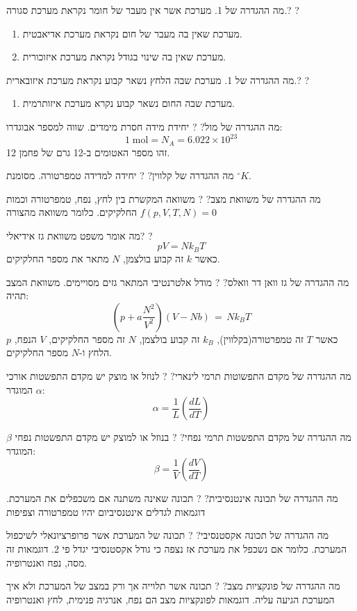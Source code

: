 \documentclass{tstextbook}
\begin{document}
מה ההגדרה של 1. מערכת אשר אין מעבר של חומר נקראת מערכת סגורה.?
?

\begin{enumerate}
  \item מערכת שאין בה מעבר של חום נקראת מערכת אדיאבטית. 


  \item מערכת שאין בה שינוי בגודל נקראת מערכת איזוכורית. 


\end{enumerate}
מה ההגדרה של 1. מערכת שבה הלחץ נשאר קבוע נקראת מערכת איזובארית.?
?

\begin{enumerate}
  \item מערכת שבה החום נשאר קבוע נקרא מערכת איזותרמית. 
\end{enumerate}
מה ההגדרה של מול?
?
יחידת מידה חסרת מימדים. שווה למספר אבוגדרו:
$$1\;{\mathrm{mol}}=N_{A}=6.022\times10^{23}$$
זהו מספר האטומים ב-12 גרם של פחמן 12.

מה ההגדרה של קלווין?
?
יחידה למדידה טמפרטורה. מסומנת \(^\circ K\).

מה ההגדרה של משוואת מצב?
?
משוואה המקשרת בין לחץ, נפח, טמפרטורה וכמות החלקיקים. כלומר משוואה מהצורה \(f\left(p,V,T,N \right)=0\)

מה אומר משפט משוואת גז אידיאלי?
?
$$pV = Nk_{B}T$$
כאשר \(k\) זה קבוע בולצמן, \(N\) מתאר את מספר החלקיקים.

מה ההגדרה של גז וואן דר וואלס?
?
מודל אלטרנטיבי המתאר גזים מסויימים. משוואת המצב תהיה:
$$\left(p+a\frac{N^{2}}{V^{2}}\right)\left(V-N b\right)\,=\,N k_{B}T$$
כאשר \(T\) זה טמפרטורה(בקלווין), \(k_{B}\) זה קבוע בולצמן, \(N\) זה מספר החלקיקים, \(V\) הנפח, \(p\) הלחץ ו-\(N\) מספר החלקיקים.

מה ההגדרה של מקדם התפשוטות תרמי לינארי?
?
לנוזל או מוצק יש מקדם התפשטות אורכי \(\alpha\) המוגדר:
$$\alpha\!=\!{\frac{1}{L}}\!\left({\frac{d L}{d T}}\right)$$

מה ההגדרה של מקדם התפשטות תרמי נפחי?
?
בנוזל או למוצק יש מקדם התפשטות נפחי \(\beta\) המוגדר:
$$\beta\!=\!{\frac{1}{V}}\!\left({\frac{d V}{d T}}\right)$$

מה ההגדרה של תכונה אינטנסיבית?
?
תכונה שאינה משתנה אם משכפלים את המערכת. דוגמאות לגדלים אינטנסיביום יהיו טמפרטורה וצפיפות

מה ההגדרה של תכונה אקסטנסיבי?
?
תכונה של המערכת אשר פרופרציונאלי לשיכפול המערכת. כלומר אם נשכפל את מערכת אז נצפה כי גודל אקסטנסיבי יגדל פי 2. דוגמאות זה מסה, נפח ואנטרופיה.

מה ההגדרה של פונקציות מצב?
?
תכונה אשר תלוייה אך ורק במצב של המערכת ולא איך המערכת הגיעה עליה. דוגמאות לפונקציות מצב הם נפח, אנרגיה פנימית, לחץ ואנטרופיה
\end{document}
